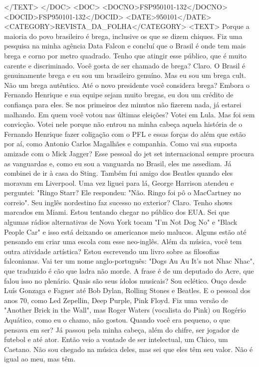 </TEXT>
</DOC>
<DOC>
<DOCNO>FSP950101-132</DOCNO>
<DOCID>FSP950101-132</DOCID>
<DATE>950101</DATE>
<CATEGORY>REVISTA_DA_FOLHA</CATEGORY>
<TEXT>
Porque a maioria do povo brasileiro é brega, inclusive os que se dizem chiques. Fiz uma pesquisa na minha agência Data Falcon e concluí que o Brasil é onde tem mais brega e corno por metro quadrado. Tenho que atingir esse público, que é muito carente e discriminado.
Você gosta de ser chamado de brega?
Claro. O Brasil é genuinamente brega e eu sou um brasileiro genuíno. Mas eu sou um brega cult. Não um brega autêntico.
Até o novo presidente você considera brega?
Embora o Fernando Henrique e sua equipe sejam muito bregas, eu dou um crédito de confiança para eles. Se nos primeiros dez minutos não fizerem nada, já estarei malhando.
Em quem você votou nas últimas eleições?
Votei em Lula. Mas foi sem convicção. Votei nele porque não entrou na minha cabeça aquela história de o Fernando Henrique fazer coligação com o PFL e essas forças do além que estão por aí, como Antonio Carlos Magalhães e companhia.
Como vai sua suposta amizade com o Mick Jagger?
Esse pessoal do jet set internacional sempre procura as vanguardas e, como eu sou a vanguarda no Brasil, eles me assediam. Já combinei de ir à casa do Sting. Também fui amigo dos Beatles quando eles moravam em Liverpool. Uma vez liguei para lá, George Harrison atendeu e perguntei: "Ringo Starr? Ele respondeu: "Não. Ringo foi pô o MacCartney no correio".
Seu inglês nordestino faz sucesso no exterior?
Claro. Tenho shows marcados em Miami. Estou tentando chegar no público dos EUA. Sei que algumas rádios alternativas de Nova York tocam "I'm Not Dog No" e "Black People Car" e isso está deixando os americanos meio malucos. Alguns estão até pensando em criar uma escola com esse neo-inglês.
Além da música, você tem outra atividade artística?
Estou escrevendo um livro sobre as filosofias falconianas. Vai ter um nome anglo-português: "Dogs Au Au It's not Nhac Nhac", que traduzido é cão que ladra não morde. A frase é de um deputado do Acre, que falou isso no plenário.
Quais são seus ídolos musicais?
Sou eclético. Ouço desde Luís Gonzaga e Fagner até Bob Dylan, Rolling Stones e Beatles. E o pessoal dos anos 70, como Led Zepellin, Deep Purple, Pink Floyd. Fiz uma versão de "Another Brick in the Wall", mas Roger Waters (vocalista do Pink) ou Rogério Aquático, como eu o chamo, não gostou.
Quando você era pequeno, o que pensava em ser?
Já passou pela minha cabeça, além do chifre, ser jogador de futebol e até ator. Então veio a vontade de ser intelectual, um Chico, um Caetano. Não sou chegado na música deles, mas sei que eles têm seu valor. Não é igual ao meu, mas têm.
